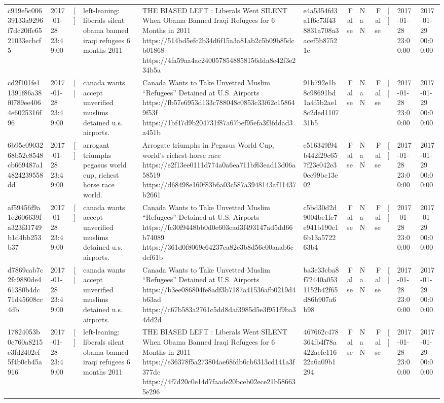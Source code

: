 \begin{tabular}{llllllrlrlll}
c919e5c00639133a9296f7dc20ffe6521033ecbcf5 & 2017-01-28 23:49:00 & [] & left-leaning: liberals silent obama banned iraqi refugees 6 months 2011 & THE BIASED LEFT : Liberals Went SILENT When Obama Banned Iraqi Refugees for 6 Months in 2011 https://514bd5efc2b34d6f15a3a81ab2c5b09b85dcb01868 https://4fa59aa4ac2400578548858156dda8e42f3e234b5a & e4a5354fd3a1f6c73f438831a708a3acef5b87521e & False & NaN & False & [] & 2017-01-28 23:00:00 & 2017-01-29 00:00:00 \\
cd2f101fe11391f86a38f0789ee4064e6025316f96 & 2017-01-28 23:49:00 & [] & canada wants accept unverified muslims detained u.s. airports. & Canada Wants to Take Unvetted Muslim “Refugees” Detained at U.S. Airports https://fb57e6953d133c788048c0853c33f62c158649f53f https://1bf47d9b204731f87a67bef95efa3f3fddad3a451b & 91b792e1b8c98691bd1a4f5b2ae18c2ded110731b5 & False & NaN & False & [] & 2017-01-28 23:00:00 & 2017-01-29 00:00:00 \\
6b95c0903268b52c8548cb669487a14824239558dd & 2017-01-28 23:49:00 & [] & arrogant triumphs pegasus world cup, richest horse race world. & Arrogate triumphs in Pegasus World Cup, world's richest horse race https://e2f13ee0111d774a0a6ea711bf63ead13d06a58519 https://d68498e160f83b6a03c587a3948143af11437b2661 & e516349f94b442f29c657f23e042e30ec99bc13e02 & False & NaN & False & [] & 2017-01-28 23:00:00 & 2017-01-29 00:00:00 \\
af59456f9a1e2606639fa323f31749b1d4bb253b37 & 2017-01-28 23:49:00 & [] & canada wants accept unverified muslims detained u.s. airports. & Canada Wants to Take Unvetted Muslim “Refugees” Detained at U.S. Airports https://fc30f9448bb0d0e603ead3f493147ad5dd66b74089 https://361d0f8069e64237ea82e3b8d56e00aaab6cdcf61b & c5bd30d2d9004be1fe7e941b190c16b13a572263b4 & False & NaN & False & [] & 2017-01-28 23:00:00 & 2017-01-29 00:00:00 \\
d7869cab7c2fc9880de461380b4dc71d45608cc4db & 2017-01-28 23:49:00 & [] & canada wants accept unverified muslims detained u.s. airports. & Canada Wants to Take Unvetted Muslim “Refugees” Detained at U.S. Airports https://b3ee086804fe8adf3b7187a41536afb0219d4b63ad https://c67b583a2761c5dd8daf3985d5e3f951f9ba34dd2d & ba3e33cba8f72440a0531152b42f65d86b907a6b98 & False & NaN & False & [] & 2017-01-28 23:00:00 & 2017-01-29 00:00:00 \\
17824053b0e760a8215e3fd2402ef5f4b0cb45a916 & 2017-01-28 23:49:00 & [] & left-leaning: liberals silent obama banned iraqi refugees 6 months 2011 & THE BIASED LEFT : Liberals Went SILENT When Obama Banned Iraqi Refugees for 6 Months in 2011 https://e36378f5a273804ae68fdb6cb6313cd141a3f377dc https://4f7d20c0e14d7faade20bceb02ece21b586635e296 & 467662c478364fb4f78a422aefc11622a6a09b1294 & False & NaN & False & [] & 2017-01-28 23:00:00 & 2017-01-29 00:00:00 \\

\end{tabular}
